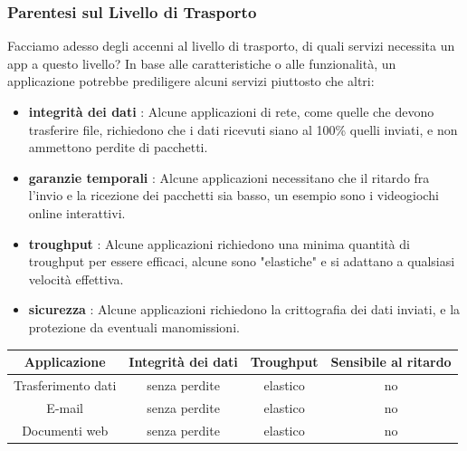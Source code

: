 \documentclass[12pt, letterpaper]{article}
\begin{document}
\subsubsection{Parentesi sul Livello di Trasporto}
Facciamo adesso degli accenni al livello di trasporto, di quali servizi necessita un app a questo livello? In
base alle caratteristiche o alle funzionalità, un applicazione potrebbe prediligere alcuni servizi piuttosto che altri:\begin{itemize}
    \item \textbf{integrità dei dati} : Alcune applicazioni di rete, come quelle che devono trasferire file,
          richiedono che i dati ricevuti siano al 100\% quelli inviati, e non ammettono perdite di pacchetti.
    \item \textbf{garanzie temporali} : Alcune applicazioni necessitano che il ritardo fra l'invio e la
          ricezione dei pacchetti sia basso, un esempio sono i videogiochi online interattivi.
    \item \textbf{troughput} : Alcune applicazioni richiedono una minima quantità di troughput per essere
          efficaci, alcune sono "elastiche" e si adattano a qualsiasi velocità effettiva.
    \item \textbf{sicurezza} : Alcune applicazioni richiedono la crittografia dei dati inviati, e la protezione
          da eventuali manomissioni.
\end{itemize}\begin{center}
    \begin{tabular}{|c|c|c|c|}
        \hline
        \rowcolor[HTML]{ECF4FF}
        \textbf{Applicazione}      & \textbf{Integrità dei dati} & \textbf{Troughput}                                                                 & \textbf{Sensibile al ritardo} \\ \hline
        Trasferimento dati         & senza perdite               & elastico                                                                           & no                            \\ \hline
        \rowcolor[HTML]{EFEFEF}
        E-mail                     & senza perdite               & elastico                                                                           & no                            \\ \hline
        Documenti web              & senza perdite               & elastico                                                                           & no                            \\ \hline

\end{tabular}
\end{center}
\end{document}
